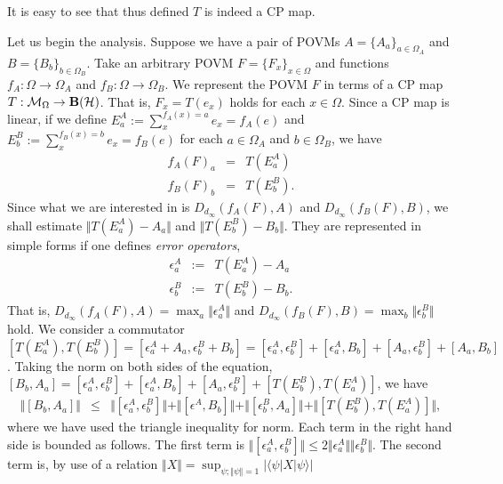 \documentclass[showpacs,preprintnumbers,amsmath,amssymb]{revtex4}
\begin{document}
It is easy to see that thus defined $T$ is indeed a CP map. 
\par
Let us begin the analysis. 
Suppose we have a pair of POVMs $A=\{A_a\}_{a\in \Omega_A}$ 
and $B=\{B_b\}_{b \in \Omega_B}$. Take an 
arbitrary POVM $F=\{F_x\}_{x\in \Omega}$ and functions 
$f_A: \Omega \to \Omega_A$ and $f_B: \Omega \to \Omega_B$. 
We represent the POVM $F$ in terms of a CP map 
$T: {\cal M}_{\Omega} \to {\bf B}({\cal H})$. 
That is, $F_x=T(e_x)$ holds for each $x \in \Omega$.
Since a CP map is linear, if we define 
$
E^A_a:=\sum_{x}^{f_A(x)=a}e_x=f_A(e)
$ and 
$E^B_b:=\sum_{x}^{f_B(x)=b}e_x=f_B(e)$
for each $a\in \Omega_A$ and $b \in \Omega_B$, 
we have
\begin{eqnarray*}
f_A(F)_a&=& T(E^A_a) \\
f_B(F)_b&=& T(E^B_b).
\end{eqnarray*} 
Since what we are interested in is 
$D_{d_{\infty}}(f_A(F),A)$ and $D_{d_{\infty}}(f_B(F),B)$, 
we shall 
estimate $\Vert T(E^A_a)-A_a\Vert$ and $\Vert T(E^B_b)-B_b \Vert$. 
They are represented in simple forms
if one defines {\it error operators},
\begin{eqnarray*}
\epsilon^A_a&:=&T(E^A_a)-A_a \\
\epsilon^B_b&:=&T(E^B_b)-B_b. 
\end{eqnarray*}
That is, $D_{d_{\infty}}(f_A(F),A)=\max_a \Vert \epsilon^A_a\Vert$ 
and $D_{d_{\infty}}(f_B(F),B)=\max_b \Vert \epsilon^B_b\Vert$ hold. 
We consider a commutator 
$[T(E^A_a),T(E^B_b)]=[\epsilon^A_a+A_a,\epsilon^B_b+B_b]
=[\epsilon^A_a, \epsilon^B_b]
+[\epsilon^A_a, B_b]+[A_a,\epsilon^B_b]+[A_a,B_b]$.
Taking the norm on both sides of the equation, 
$[B_b,A_a]=[\epsilon^A_a,\epsilon^B_b]
+[\epsilon^A_a,B_b]+[A_a,\epsilon^B_b]+[T(E^B_b),T(E^A_a)]$, 
we have
\begin{eqnarray}
\Vert [B_b,A_a]\Vert 
&\leq & \Vert [\epsilon^A_a, \epsilon^B_b ]\Vert 
+\Vert [\epsilon^A, B_b]\Vert +\Vert [\epsilon^B_b, A_a]\Vert 
+\Vert[T(E^B_b), T(E^A_a)]\Vert, 
\label{eqnorm}
\end{eqnarray}
where we have used the triangle inequality for norm. 
Each term in the right hand side is bounded as follows. 
The first term is $\Vert[\epsilon^A_a, \epsilon^B_b]\Vert \leq 2
\Vert \epsilon^A_a\Vert \Vert \epsilon^B_b\Vert$.
The second term is, by use of a relation $\Vert X\Vert =\sup_{\psi;
\Vert \psi\Vert =1} |\langle \psi|X|\psi \rangle|$
\end{document}
